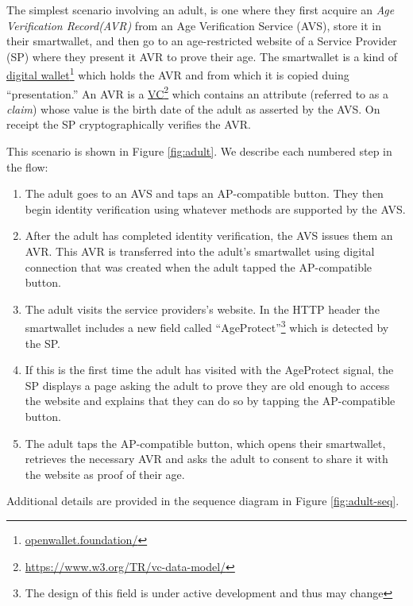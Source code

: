 \documentclass[11pt, oneside]{article}   	%
\newcommand{\hyperfootnote}[1][]{\def\ArgI{{#1}}\hyperfootnoteRelay}
\newcommand\hyperfootnoteRelay[2][]{\href{#1#2}{\ArgI}\footnote{\href{#1#2}{#2}}}
\begin{document}
The simplest scenario involving an adult, is one where they first acquire an \emph{Age Verification Record(AVR)} from an Age Verification Service (AVS), store it in their smartwallet, and then go to an age-restricted website of a Service Provider (SP) where they present it AVR to prove their age. The smartwallet is a kind of \hyperfootnote[digital wallet][https://]{openwallet.foundation/} which holds the AVR and from which it is copied duing ``presentation.'' An AVR is a \hyperfootnote[VC][https://]{https://www.w3.org/TR/vc-data-model/} which contains an attribute (referred to as a \emph{claim}) whose value is the birth date of the adult as asserted by the AVS. On receipt the SP cryptographically verifies the AVR. 

This scenario is shown in Figure \ref{fig:adult}. We describe each numbered step in the flow: 

\begin{enumerate}
	\item The adult goes to an AVS and taps an AP-compatible button. They then begin identity verification using whatever methods are supported by the AVS. 
	\item After the adult has completed identity verification, the AVS issues them an AVR. This AVR is transferred into the adult's smartwallet using digital connection that was created when the adult tapped the AP-compatible button.
	\item The adult visits the service providers's website. In the HTTP header the smartwallet includes a new field called ``AgeProtect''\footnote{The design of this field is under active development and thus may change} which is detected by the SP. 
	\item If this is the first time the adult has visited with the AgeProtect signal, the SP displays a page asking the adult to prove they are old enough to access the website and explains that they can do so by tapping the AP-compatible button.
	\item The adult taps the AP-compatible button, which opens their smartwallet, retrieves the necessary AVR and asks the adult to consent to share it with the website as proof of their age. 
\end{enumerate}

Additional details are provided in the sequence diagram in Figure \ref{fig:adult-seq}. 
\end{document}
